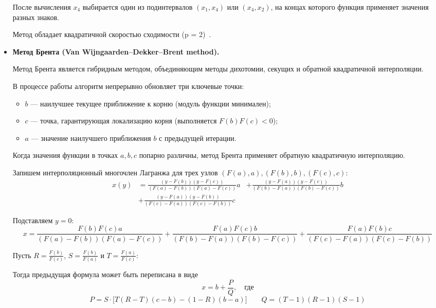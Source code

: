 \documentclass[12pt,a4paper]{article}
\theoremstyle{bigplain}
\theoremstyle{plain}
\begin{document}
\begin{itemize}
После вычисления $x_4$ выбирается один из подинтервалов $(x_1,x_4)$ или $(x_4,x_2)$,
на концах которого функция применяет значения разных знаков.

Метод обладает квадратичной скоростью сходимости (p = 2)~\cite{Press}.




\item \textbf{Метод Брента
(Van Wijngaarden--Dekker--Brent method).}

Метод Брента является гибридным методом,
объединяющим методы дихотомии, секущих
и обратной квадратичной интерполяции.

В процессе работы алгоритм непрерывно обновляет три ключевые точки:
\begin{itemize}
    \item $b$ — наилучшее текущее приближение к корню (модуль функции минимален);
    \item $c$ — точка, гарантирующая локализацию корня (выполняется $F(b)F(c) < 0$);
    \item $a$ — значение наилучшего приближения $b$ с предыдущей итерации.
\end{itemize}

Когда значения функции в точках $a, b, c$ попарно различны,
метод Брента применяет обратную квадратичную интерполяцию. 

Запишем интерполяционный многочлен Лагранжа для трех узлов $(F(a), a), (F(b), b), (F(c), c)$:
\begin{equation*}
\begin{aligned}
    x(y) &= \frac{(y - F(b))(y - F(c))}{(F(a) - F(b))(F(a) - F(c))} a 
         &+ \frac{(y - F(a))(y - F(c))}{(F(b) - F(a))(F(b) - F(c))} b \\
         &+ \frac{(y - F(a))(y - F(b))}{(F(c) - F(a))(F(c) - F(b))} c
\end{aligned}
\end{equation*}

Подставляем $y = 0$:
\begin{equation*}
    x = \frac{F(b)F(c) a}{(F(a) - F(b))(F(a) - F(c))} + \frac{F(a)F(c) b}{(F(b) - F(a))(F(b) - F(c))} + \frac{F(a)F(b) c}{(F(c) - F(a))(F(c) - F(b))}
\end{equation*}

Пусть $R = \frac{F(b)}{F(c)}$, $S = \frac{F(b)}{F(a)}$ и $T = \frac{F(a)}{F(c)}$:

Тогда предыдущая формула может быть переписана в виде
\begin{equation*}
    x = b + \frac{P}{Q}, \quad \text{где}
\end{equation*}
\begin{equation*}
    P = S \cdot \big[ T(R - T)(c - b) - (1 - R)(b - a) \big]
    \qquad Q = (T - 1)(R - 1)(S - 1)
\end{equation*}


\end{itemize}
\end{document}
